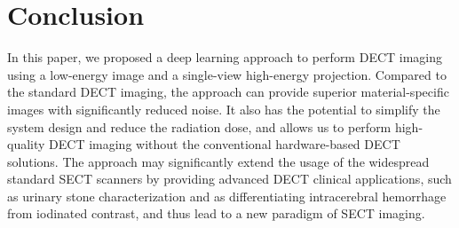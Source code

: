 \documentclass[journal,twoside,web]{ieeecolor}
\begin{document}
\section{Conclusion}
In this paper, we proposed a deep learning approach to perform DECT imaging using a low-energy image and a single-view high-energy projection. Compared to the standard DECT imaging, the approach can provide superior material-specific images with significantly reduced noise. It also has the potential to simplify the system design and reduce the radiation dose, and allows us to perform high-quality DECT imaging without the conventional hardware-based DECT solutions. The approach may significantly extend the usage of the widespread standard SECT scanners by providing advanced DECT clinical applications, such as urinary stone characterization and as differentiating intracerebral hemorrhage from iodinated contrast, and thus lead to a new paradigm of SECT imaging. %
\end{document}
